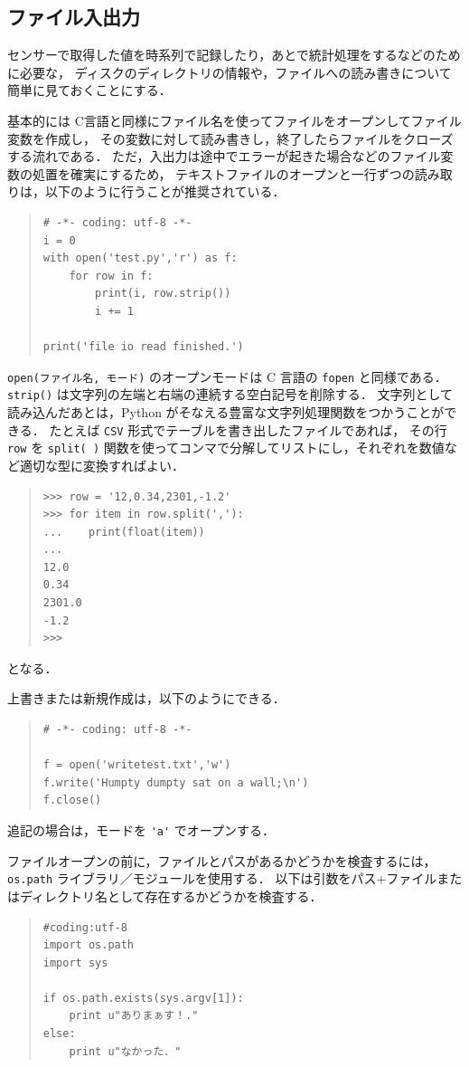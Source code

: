 \documentclass[11pt,a4,epsf]{report}
\begin{document}
\subsection{ファイル入出力}

センサーで取得した値を時系列で記録したり，あとで統計処理をするなどのために必要な，
ディスクのディレクトリの情報や，ファイルへの読み書きについて簡単に見ておくことにする．

基本的には C言語と同様にファイル名を使ってファイルをオープンしてファイル変数を作成し，
その変数に対して読み書きし，終了したらファイルをクローズする流れである．
ただ，入出力は途中でエラーが起きた場合などのファイル変数の処置を確実にするため，
テキストファイルのオープンと一行ずつの読み取りは，以下のように行うことが推奨されている．
\begin{quote}
\small
\begin{verbatim}
# -*- coding: utf-8 -*-
i = 0
with open('test.py','r') as f:
    for row in f:
        print(i, row.strip())
        i += 1

print('file io read finished.')
\end{verbatim}
\end{quote}
\verb+open(ファイル名, モード)+ のオープンモードは C 言語の \verb+fopen+ と同様である．
\verb+strip()+ は文字列の左端と右端の連続する空白記号を削除する．
文字列として読み込んだあとは，Python がそなえる豊富な文字列処理関数をつかうことができる．
たとえば \verb+CSV+ 形式でテーブルを書き出したファイルであれば，
その行 \verb+row+ を \verb+split( )+ 関数を使ってコンマで分解してリストにし，それぞれを数値など適切な型に変換すればよい．
\begin{quote}
\small
\begin{verbatim}
>>> row = '12,0.34,2301,-1.2'
>>> for item in row.split(','):
...    print(float(item))
...
12.0
0.34
2301.0
-1.2
>>>
\end{verbatim}
\end{quote}
となる．

上書きまたは新規作成は，以下のようにできる．
\begin{quote}
\small
\begin{verbatim}
# -*- coding: utf-8 -*-

f = open('writetest.txt','w')
f.write('Humpty dumpty sat on a wall;\n')
f.close()
\end{verbatim}
\end{quote}
追記の場合は，モードを \verb+'a'+ でオープンする．

ファイルオープンの前に，ファイルとパスがあるかどうかを検査するには，\verb+os.path+ ライブラリ／モジュールを使用する．
以下は引数をパス+ファイルまたはディレクトリ名として存在するかどうかを検査する．
\begin{quote}
\small
\begin{verbatim}
#coding:utf-8
import os.path
import sys

if os.path.exists(sys.argv[1]):
    print u"ありまぁす！."
else:
    print u"なかった．"
\end{verbatim}
\end{quote}
\end{document}

